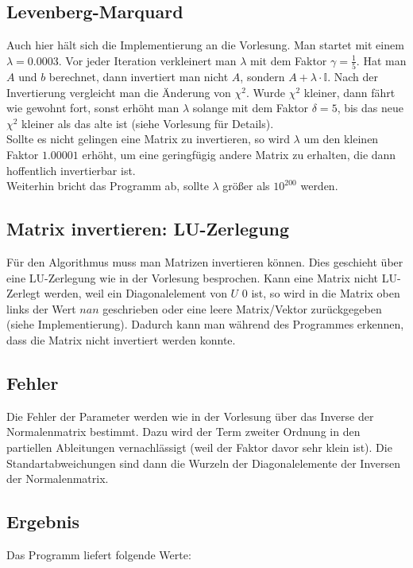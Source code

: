 \documentclass{scrreprt}
\begin{document}
\subsection*{Levenberg-Marquard}
Auch hier hält sich die Implementierung an die Vorlesung. Man startet mit einem $\lambda = 0.0003$. Vor jeder Iteration verkleinert man $\lambda$ mit dem Faktor $\gamma = \frac{1}{5}$.
Hat man $A$ und $b$ berechnet, dann invertiert man nicht $A$, sondern $A + \lambda\cdot\mathbb{I}$. Nach der Invertierung vergleicht man die Änderung von $\chi^2$. Wurde $\chi^2$ kleiner, dann fährt wie gewohnt fort, sonst erhöht man $\lambda$ solange mit dem Faktor $\delta = 5$, bis das neue $\chi^2$ kleiner als das alte ist (siehe Vorlesung für Details).\\

Sollte es nicht gelingen eine Matrix zu invertieren, so wird $\lambda$ um den kleinen Faktor $1.00001$ erhöht, um eine geringfügig andere Matrix zu erhalten, die dann hoffentlich invertierbar ist.\\

Weiterhin bricht das Programm ab, sollte $\lambda$ größer als $10^{200}$ werden.

\subsection*{Matrix invertieren: LU-Zerlegung}
Für den Algorithmus muss man Matrizen invertieren können. Dies geschieht über eine LU-Zerlegung wie in der Vorlesung besprochen. Kann eine Matrix nicht LU-Zerlegt werden, weil ein Diagonalelement von $U$ 0 ist, so wird in die Matrix oben links der Wert $nan$ geschrieben oder eine leere Matrix/Vektor zurückgegeben (siehe Implementierung). Dadurch kann man während des Programmes erkennen, dass die Matrix nicht invertiert werden konnte.

\subsection*{Fehler}

Die Fehler der Parameter werden wie in der Vorlesung über das Inverse der Normalenmatrix bestimmt. Dazu wird der Term zweiter Ordnung in den partiellen Ableitungen vernachlässigt (weil der Faktor davor sehr klein ist). Die Standartabweichungen sind dann die Wurzeln der Diagonalelemente der Inversen der Normalenmatrix.

\subsection*{Ergebnis}
Das Programm liefert folgende Werte:\\
\end{document}
